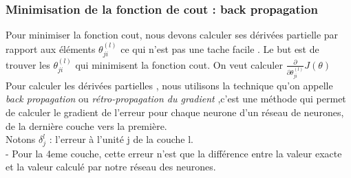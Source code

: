 \subsubsection{Minimisation de la fonction de cout : back propagation }
Pour minimiser la fonction cout,  nous devons calculer ses dérivées partielle par rapport aux éléments ${\theta}_{ji}^{(l)}$ ce qui n'est pas une tache facile .
Le but est de trouver les ${\theta}_{ji}^{(l)}$ qui minimisent la fonction cout.
On veut calculer $\frac{\partial }{\partial {\theta}_{ji}^{(l)} }J\left({\theta }\right)$ \\
Pour calculer les dérivées partielles , nous utilisons la technique qu'on appelle \emph{back propagation } ou \emph{rétro-propagation du gradient  } ,c'est une méthode qui permet de calculer le gradient de l'erreur pour chaque neurone d'un réseau de neurones, de la dernière couche vers la première.\\
Notons ${\delta}_{j}^{l}$ : l'erreur à l'unité j de la couche l. \\
- Pour la 4eme couche,  cette erreur n'est que la différence entre la valeur exacte et la valeur calculé par notre réseau des neurones.


